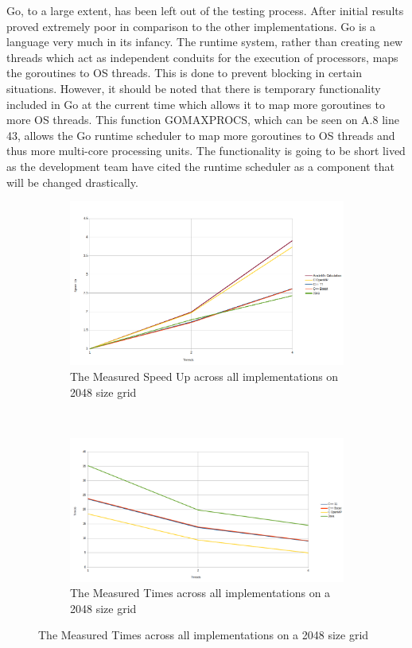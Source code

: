 \documentclass[11pt]{article} %
\begin{document}
Go, to a large extent, has been left out of the testing process. After initial results proved extremely poor in comparison to the other implementations. Go is a language very much in its infancy. The runtime system, rather than creating new threads which act as independent conduits for the execution of processors, maps the goroutines to OS threads. This is done to prevent blocking in certain situations. However, it should be noted that there is temporary functionality included in Go at the current time which allows it to map more goroutines to more OS threads. This function GOMAXPROCS, which can be seen on A.8 line 43, allows the Go runtime scheduler to map more goroutines to OS threads and thus more multi-core processing units. The functionality is going to be short lived as the development team have cited the runtime scheduler as a component that will be changed drastically. 
\begin{figure}[]
\centering
\begin{subfigure}[b]{1\textwidth}
\centering
\includegraphics[width=\textwidth]{measuredSpeedup2048.png}
\caption{The Measured Speed Up across all implementations on 2048 size grid}
\label{fig: speedup1}
\end{subfigure}
~ 
\begin{subfigure}[b]{1\textwidth}
\centering
\includegraphics[width=\textwidth]{measured204810004.png}
\caption{The Measured Times across all implementations on a 2048 size grid}
\label{fig: measured1}
\end{subfigure}
\end{figure}
\end{document}
